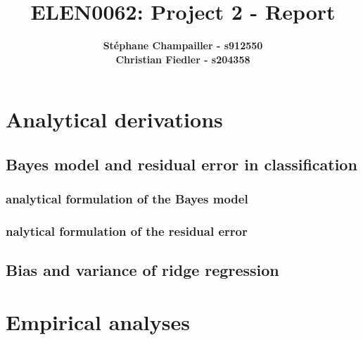 \documentclass{article}
\begin{document}

\title{\Large{ELEN0062: Project 2 - Report}}
\vspace{1cm}
\author{\small{\bf Stéphane Champailler - s912550 } \\ \small{\bf Christian Fiedler - s204358}}



\maketitle


\def\picwidth{8cm}

\section{Analytical derivations}
\subsection{Bayes model and residual error in classification}
\subsubsection{analytical formulation of the Bayes model}
\subsubsection{nalytical formulation of the residual error}

\subsection{Bias and variance of ridge regression}

\section{Empirical analyses}
\end{document}
